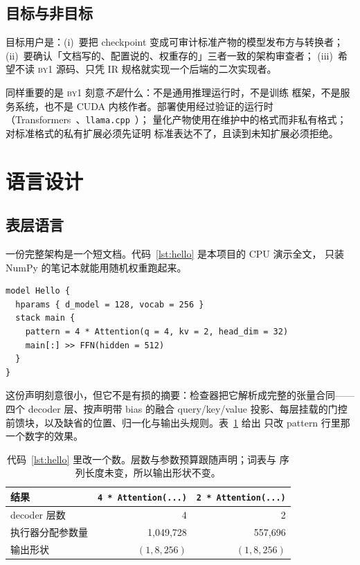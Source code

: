 \documentclass[11pt,a4paper]{ctexart}
\newcommand{\code}[1]{\texttt{#1}}
\newcommand{\byone}{\textsc{by1}}
\begin{document}
\subsection{目标与非目标}

目标用户是：(i)~要把 checkpoint 变成可审计标准产物的模型发布方与转换者；
(ii)~要确认「文档写的、配置说的、权重存的」三者一致的架构审查者；
(iii)~希望不读 \byone{} 源码、只凭 IR 规格就实现一个后端的二次实现者。

同样重要的是 \byone{} 刻意\emph{不是}什么：不是通用推理运行时，不是训练
框架，不是服务系统，也不是 CUDA 内核作者。部署使用经过验证的运行时
（Transformers~\cite{wolf2020transformers}、\code{llama.cpp}~\cite{llamacpp2023}）；
量化产物使用在维护中的格式而非私有格式；对标准格式的私有扩展必须先证明
标准表达不了，且读到未知扩展必须拒绝。

\section{语言设计}
\label{sec:lang}

\subsection{表层语言}

一份完整架构是一个短文档。代码~\ref{lst:hello} 是本项目的 CPU 演示全文，
只装 NumPy 的笔记本就能用随机权重跑起来。

\begin{lstlisting}[caption={完整的演示架构 \code{models/hello.by1}。},
label={lst:hello}]
model Hello {
  hparams { d_model = 128, vocab = 256 }
  stack main {
    pattern = 4 * Attention(q = 4, kv = 2, head_dim = 32)
    main[:] >> FFN(hidden = 512)
  }
}
\end{lstlisting}

这份声明刻意很小，但它不是有损的摘要：检查器把它解析成完整的张量合同——
四个 decoder 层、按声明带 bias 的融合 query/key/value 投影、每层挂载的门控
前馈块，以及缺省的位置、归一化与输出头规则。表~\ref{tab:onechange} 给出
只改 pattern 行里那一个数字的效果。

\begin{table}[t]
\centering\small
\caption{代码~\ref{lst:hello} 里改一个数。层数与参数预算跟随声明；词表与
序列长度未变，所以输出形状不变。}
\label{tab:onechange}
\begin{tabular}{@{}lrr@{}}
\toprule
结果 & \code{4 * Attention(...)} & \code{2 * Attention(...)} \\
\midrule
decoder 层数 & 4 & 2 \\
执行器分配参数量 & 1{,}049{,}728 & 557{,}696 \\
输出形状 & $(1, 8, 256)$ & $(1, 8, 256)$ \\
\bottomrule
\end{tabular}
\end{table}
\end{document}

